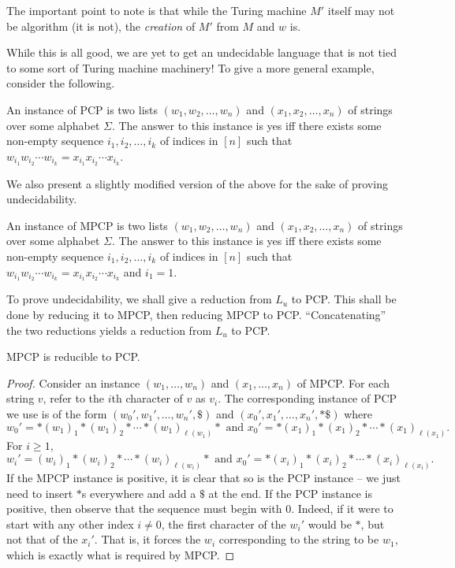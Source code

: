 	The important point to note is that while the Turing machine $M'$ itself may not be algorithm (it is not), the \emph{creation} of $M'$ from $M$ and $w$ is.

	While this is all good, we are yet to get an undecidable language that is not tied to some sort of Turing machine machinery! To give a more general example, consider the following.

	\begin{fprob}
		An instance of PCP is two lists $(w_1,w_2,\ldots,w_n)$ and $(x_1,x_2,\ldots,x_n)$ of strings over some alphabet $\Sigma$. The answer to this instance is yes iff there exists some non-empty sequence $i_1,i_2,\ldots,i_k$ of indices in $[n]$ such that $w_{i_1} w_{i_2} \cdots w_{i_k} = x_{i_1} x_{i_2} \cdots x_{i_k}$.
	\end{fprob}

	We also present a slightly modified version of the above for the sake of proving undecidability.

	\begin{problem}
		An instance of MPCP is two lists $(w_1,w_2,\ldots,w_n)$ and $(x_1,x_2,\ldots,x_n)$ of strings over some alphabet $\Sigma$. The answer to this instance is yes iff there exists some non-empty sequence $i_1,i_2,\ldots,i_k$ of indices in $[n]$ such that $w_{i_1} w_{i_2} \cdots w_{i_k} = x_{i_1} x_{i_2} \cdots x_{i_k}$ and $i_1 = 1$.
	\end{problem}

	To prove undecidability, we shall give a reduction from $L_u$ to PCP. This shall be done by reducing it to MPCP, then reducing MPCP to PCP. ``Concatenating'' the two reductions yields a reduction from $L_u$ to PCP.

	\begin{theorem}
		MPCP is reducible to PCP.
	\end{theorem}
	\begin{proof}
		Consider an instance $(w_1,\ldots,w_n)$ and $(x_1,\ldots,x_n)$ of MPCP. For each string $v$, refer to the $i$th character of $v$ as $v_i$. The corresponding instance of PCP we use is of the form $(w_0',w_1',\ldots,w_n',\$)$ and $(x_0',x_1',\ldots,x_n',*\$)$ where
		\[ w_0' = *(w_1)_1*(w_1)_2*\cdots*(w_1)_{\ell(w_1)}* \text{ and } x_0' = *(x_1)_1*(x_1)_2*\cdots*(x_1)_{\ell(x_1)}. \]
		For $i \ge 1$,
		\[ w_i' = (w_i)_1*(w_i)_2*\cdots*(w_i)_{\ell(w_i)}* \text{ and } x_0' = *(x_i)_1*(x_i)_2*\cdots*(x_i)_{\ell(x_i)}. \]
		If the MPCP instance is positive, it is clear that so is the PCP instance -- we just need to insert $*$s everywhere and add a $\$$ at the end. If the PCP instance is positive, then observe that the sequence must begin with $0$. Indeed, if it were to start with any other index $i \ne 0$, the first character of the $w_i'$ would be $*$, but not that of the $x_i'$. That is, it forces the $w_i$ corresponding to the string to be $w_1$, which is exactly what is required by MPCP.
	\end{proof}

